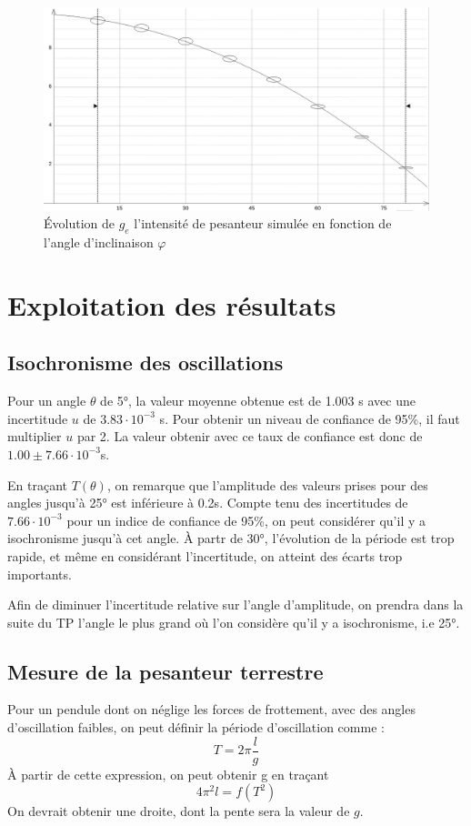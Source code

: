 \documentclass[a4paper,10pt,french]{scrartcl}
\begin{document}
\begin{figure}[H]
 \begin{center}
 \includegraphics[scale=0.3]{graph_4}
 \end{center}
 \caption{Évolution de \(g_e\) l'intensité de pesanteur simulée en fonction de l'angle d'inclinaison \(\varphi\) }
\end{figure}
\section{Exploitation des résultats}
\subsection{Isochronisme des oscillations}
Pour un angle \(\theta\) de 5°, la valeur moyenne obtenue est de 1.003 s avec une incertitude \(u\) de \(3.83\cdot 10^{-3}\) s. Pour obtenir un niveau de confiance de 95\%, il faut multiplier \(u\) par 2. La valeur obtenir avec ce taux de confiance est donc de \(1.00\pm 7.66 \cdot10^{-3}\)s.

En traçant \(T(\theta)\), on remarque que l'amplitude des valeurs prises pour des angles jusqu'à 25° est inférieure à 0.2s. Compte tenu des incertitudes de \(7.66 \cdot10^{-3}\) pour un indice de confiance de 95\%, on peut considérer qu'il y a isochronisme jusqu'à cet angle. À partr de 30°, l'évolution de la période est trop rapide, et m\^eme en considérant l'incertitude, on atteint des écarts trop importants.

Afin de diminuer l'incertitude relative sur l'angle d'amplitude, on prendra dans la suite du TP l'angle le plus grand où l'on considère qu'il y a isochronisme, i.e 25°.
\subsection{Mesure de la pesanteur terrestre}
Pour un pendule dont on néglige les forces de frottement, avec des angles d'oscillation faibles, on peut définir la période d'oscillation comme : \begin{equation}T = 2\pi \frac{l}{g}\label{eq:1}\end{equation} À partir de cette expression, on peut obtenir g en traçant \[4\pi^2l = f(T^2)\] On devrait obtenir une droite, dont la pente sera la valeur de \(g\).
\end{document}
